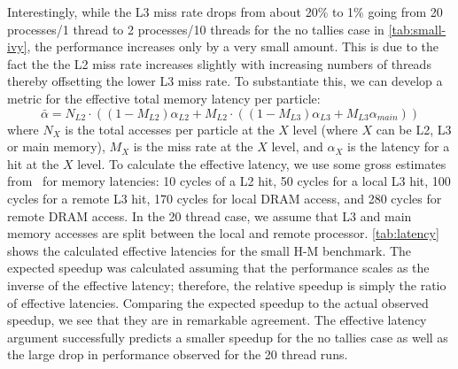 \documentclass{mc2015}
\begin{document}
Interestingly, while the L3 miss rate drops from about 20\% to 1\% going from
20 processes/1 thread to 2 processes/10 threads for the no tallies case in
\autoref{tab:small-ivy}, the performance increases only by a very small
amount. This is due to the fact the the L2 miss rate increases slightly with
increasing numbers of threads thereby offsetting the lower L3 miss rate. To
substantiate this, we can develop a metric for the effective total memory
latency per particle:
\begin{equation}
  \bar{\alpha} = N_{L2}\cdot \left ( (1-M_{L2})\alpha_{L2} + M_{L2}\cdot((1 -
  M_{L3})\alpha_{L3} + M_{L3} \alpha_{main}) \right )
\end{equation}
where $N_X$ is the total accesses per particle at the $X$ level (where $X$ can
be L2, L3 or main memory), $M_X$ is the miss rate at the $X$ level, and
$\alpha_X$ is the latency for a hit at the $X$ level. To calculate the effective
latency, we use some gross estimates from~\cite{intel} for memory latencies: 10
cycles of a L2 hit, 50 cycles for a local L3 hit, 100 cycles for a remote L3
hit, 170 cycles for local DRAM access, and 280 cycles for remote DRAM access. In
the 20 thread case, we assume that L3 and main memory accesses are split between
the local and remote processor. \autoref{tab:latency} shows the calculated
effective latencies for the small H-M benchmark. The expected speedup was
calculated assuming that the performance scales as the inverse of the effective
latency; therefore, the relative speedup is simply the ratio of effective
latencies. Comparing the expected speedup to the actual observed speedup, we see
that they are in remarkable agreement. The effective latency argument
successfully predicts a smaller speedup for the no tallies case as well as the
large drop in performance observed for the 20 thread runs.
\end{document}
